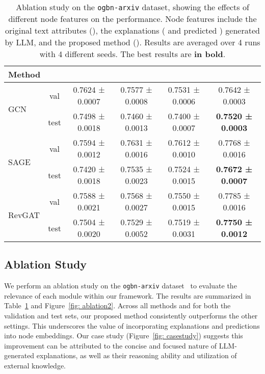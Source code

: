 \documentclass{article}
\begin{document}
\begin{table}[t]
\small
\caption{Ablation study on the \texttt{ogbn-arxiv} dataset, showing the effects of different node features on the performance. Node features include the original text attributes (), the explanations (  and predicted ) generated by LLM, and the proposed method (). Results are averaged over 4 runs with 4 different seeds. The best results are \textbf{in bold}.}
    \label{tab: ablation}
    \centering
    \begin{tabular}{lccccc}
    \toprule
    \multicolumn{2}{l}{Method}   &   &  &  & \\
    \midrule
    \multirow{2}{*}{GCN}
    & val & 0.7624 ± 0.0007 & 0.7577 ± 0.0008 & 0.7531 ± 0.0006 & 0.7642 ± 0.0003\\
    & test & 0.7498 ± 0.0018 & 0.7460 ± 0.0013 & 0.7400 ± 0.0007 & \textbf{0.7520 ± 0.0003}\\
    \midrule
    \multirow{2}{*}{SAGE}
    & val & 0.7594 ± 0.0012 & 0.7631 ± 0.0016 & 0.7612 ± 0.0010 & 0.7768 ± 0.0016\\
    & test & 0.7420 ± 0.0018 & 0.7535 ± 0.0023 & 0.7524 ± 0.0015 & \textbf{0.7672 ± 0.0007}\\
    \midrule
    \multirow{2}{*}{RevGAT}
    & val & 0.7588 ± 0.0021 &  0.7568 ± 0.0027 &  0.7550 ± 0.0015 & 0.7785 ± 0.0016\\
    & test & 0.7504 ± 0.0020 & 0.7529 ± 0.0052 & 0.7519 ± 0.0031 & \textbf{0.7750 ± 0.0012}
    \\ \bottomrule
    \end{tabular}
\end{table}

\subsection{Ablation Study}\label{subsec: ablation study}

We perform an ablation study on the \texttt{ogbn-arxiv} dataset~\citep{hu2020open} to evaluate the relevance of each module within our framework. The results are summarized in Table~\ref{tab: ablation} and Figure~\ref{fig: ablation2}. Across all methods and for both the validation and test sets, our proposed method consistently outperforms the other settings. This underscores the value of incorporating explanations and predictions into node embeddings. Our case study (Figure~\ref{fig: casestudy}) suggests this improvement can be attributed to the concise and focused nature of LLM-generated explanations, as well as their reasoning ability and utilization of external knowledge.
\end{document}
